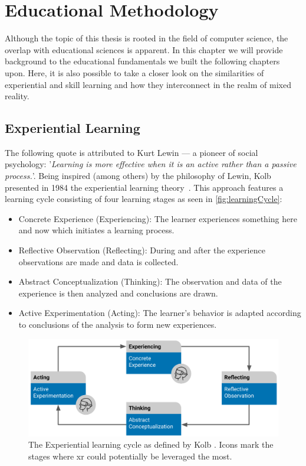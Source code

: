 %
\chapter{Educational Methodology \label{chap:concepts}}
Although the topic of this thesis is rooted in the field of computer science, the overlap with educational sciences is apparent. In this chapter we will provide background to the educational fundamentals we built the following chapters upon. Here, it is also possible to take a closer look on the similarities of experiential and skill learning and how they interconnect in the realm of mixed reality.


\section{Experiential Learning \label{sec:experiential}}
The following quote is attributed to Kurt Lewin --- a pioneer of social psychology: '\emph{Learning is more effective when it is an active rather than a passive process.}'. Being inspired (among others) by the philosophy of Lewin, Kolb presented in 1984 the experiential learning theory~\cite{kolb:1984:experiential}.
This approach features a learning cycle consisting of four learning stages as seen in \autoref{fig:learningCycle}:

\begin{itemize}
    \setlength{\itemsep}{-0.3cm}
    \item Concrete Experience (Experiencing): The learner experiences something here and now which initiates a learning process.
    \item Reflective Observation (Reflecting): During and after the experience observations are made and data is collected.
    \item Abstract Conceptualization (Thinking): The observation and data of the experience is then analyzed and conclusions are drawn.
    \item Active Experimentation (Acting): The learner's behavior is adapted according to conclusions of the analysis to form new experiences. 
\end{itemize}

\begin{figure}[h!bt]
	\centering
	\includegraphics[width=0.9\linewidth]{pictures/ExperientialLearningCycle2.png}
	\captionsetup{labelfont=bf,textfont=it}
	\caption[The Experiential learning cycle as defined by Kolb \cite{kolb:1984:experiential}.]{The Experiential learning cycle as defined by Kolb \cite{kolb:1984:experiential}. Icons mark the stages where \acrshort{xr} could potentially be leveraged the most.\label{fig:learningCycle}}
\end{figure}

